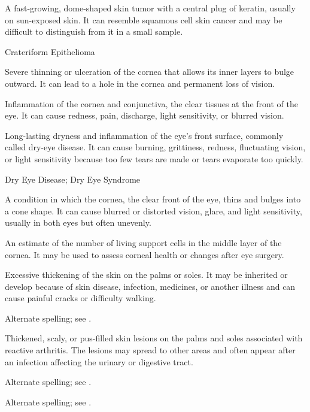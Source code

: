  A fast-growing, dome-shaped skin tumor with a central plug of keratin, usually on sun-exposed skin. It can resemble squamous cell skin cancer and may be difficult to distinguish from it in a small sample.

\synonyms
Crateriform Epithelioma

 Severe thinning or ulceration of the cornea that allows its inner layers to bulge outward. It can lead to a hole in the cornea and permanent loss of vision.

 Inflammation of the cornea and conjunctiva, the clear tissues at the front of the eye. It can cause redness, pain, discharge, light sensitivity, or blurred vision.

 Long-lasting dryness and inflammation of the eye’s front surface, commonly called dry-eye disease. It can cause burning, grittiness, redness, fluctuating vision, or light sensitivity because too few tears are made or tears evaporate too quickly.

\synonyms
Dry Eye Disease; Dry Eye Syndrome

 A condition in which the cornea, the clear front of the eye, thins and bulges into a cone shape. It can cause blurred or distorted vision, glare, and light sensitivity, usually in both eyes but often unevenly.

 An estimate of the number of living support cells in the middle layer of the cornea. It may be used to assess corneal health or changes after eye surgery.

 Excessive thickening of the skin on the palms or soles. It may be inherited or develop because of skin disease, infection, medicines, or another illness and can cause painful cracks or difficulty walking.

 Alternate spelling; see .

 Thickened, scaly, or pus-filled skin lesions on the palms and soles associated with reactive arthritis. The lesions may spread to other areas and often appear after an infection affecting the urinary or digestive tract.

 Alternate spelling; see .

 Alternate spelling; see .

